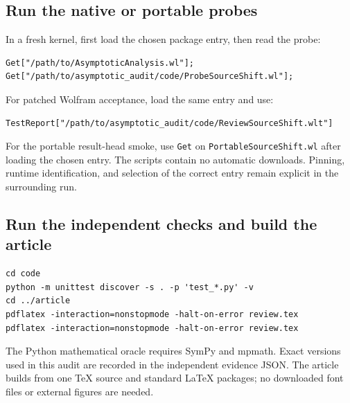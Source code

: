 \documentclass[11pt,letterpaper]{article}
\newcommand{\code}[1]{\texttt{#1}}
\begin{document}
\subsection{Run the native or portable probes}
In a fresh kernel, first load the chosen package entry, then read the probe:
\begin{lstlisting}
Get["/path/to/AsymptoticAnalysis.wl"];
Get["/path/to/asymptotic_audit/code/ProbeSourceShift.wl"];
\end{lstlisting}
For patched Wolfram acceptance, load the same entry and use:
\begin{lstlisting}
TestReport["/path/to/asymptotic_audit/code/ReviewSourceShift.wlt"]
\end{lstlisting}
For the portable result-head smoke, use \code{Get} on \code{PortableSourceShift.wl} after loading the chosen entry. The scripts contain no automatic downloads. Pinning, runtime identification, and selection of the correct entry remain explicit in the surrounding run.

\subsection{Run the independent checks and build the article}
\begin{lstlisting}
cd code
python -m unittest discover -s . -p 'test_*.py' -v
cd ../article
pdflatex -interaction=nonstopmode -halt-on-error review.tex
pdflatex -interaction=nonstopmode -halt-on-error review.tex
\end{lstlisting}
The Python mathematical oracle requires SymPy and mpmath. Exact versions used in this audit are recorded in the independent evidence JSON. The article builds from one TeX source and standard LaTeX packages; no downloaded font files or external figures are needed.
\end{document}
